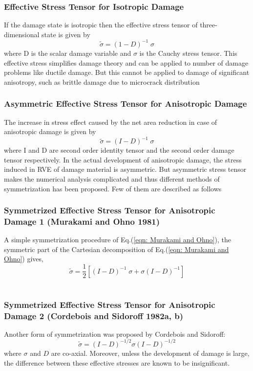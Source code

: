 \documentclass[a4paper,12pt]{extarticle}
\begin{document}
\subsubsection{Effective Stress Tensor for Isotropic Damage}
\indent\indent\indent If the damage state is isotropic then the effective stress tensor of three-dimensional state is given by
\begin{equation}
\tilde{\sigma} = (1 - D)^{-1} \; \sigma
\end{equation}
where D is the scalar damage variable and $\sigma$ is the Cauchy stress tensor. This effective stress simplifies damage theory and can be applied to number of damage problems like ductile damage. But this cannot be applied to damage of significant anisotropy, such as brittle damage due to microcrack distribution\\
\subsubsection{Asymmetric Effective Stress Tensor for Anisotropic Damage}
\indent\indent\indent The increase in stress effect caused by the net area reduction in case of anisotropic damage is given by
\begin{equation}
\tilde{\sigma} = (I - D)^{-1} \; \sigma
\end{equation}
where I and D are second order identity tensor and the second order damage tensor respectively. In the actual development of anisotropic damage, the stress induced in RVE of damage material is asymmetric. But asymmetric stress tensor makes the numerical analysis complicated and thus different methods of symmetrization has been proposed. Few of them are described as follows

\subsubsection{Symmetrized Effective Stress Tensor for Anisotropic Damage 1 (Murakami and Ohno 1981)} 
\indent\indent\indent A simple symmetrization procedure of Eq.(\ref{eqn: Murakami and Ohno}), the symmetric part of the Cartesian decomposition of Eq.(\ref{eqn: Murakami and Ohno}) gives,
\begin{equation}
\label{eqn: Murakami and Ohno}
\tilde{\sigma} = \frac{1}{2} [(I - D)^{-1}\;\sigma + \sigma(I - D)^{-1}]
\end{equation}\\
\subsubsection{Symmetrized Effective Stress Tensor for Anisotropic Damage 2 (Cordebois and Sidoroff 1982a, b)}
\indent\indent\indent Another form of symmetrization was proposed by Cordebois and Sidoroff:
\begin{equation}
\label{eqn:Cordebois and Sidoroff }
\tilde{\sigma} =  (I - D)^{-1/2}\sigma(I - D)^{-1/2}
\end{equation}
where $\sigma$ and $D$ are co-axial. Moreover, unless the development of damage is large, the difference between these effective stresses are known to be insignificant.\\
\end{document}
